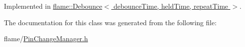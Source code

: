 Implemented in \hyperlink{classflame_1_1_debounce_ae91dc73a4becacf5f13456d1ca3b6185}{flame\-::\-Debounce$<$ debounce\-Time, held\-Time, repeat\-Time $>$}.



The documentation for this class was generated from the following file\-:\begin{DoxyCompactItemize}
\item 
flame/\hyperlink{_pin_change_manager_8h}{Pin\-Change\-Manager.\-h}\end{DoxyCompactItemize}
